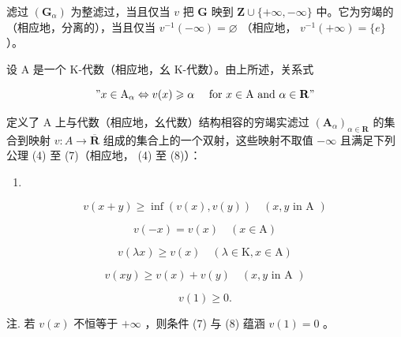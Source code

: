 滤过 \((\mathbf{G}_{\alpha})\) 为整滤过，当且仅当 \(v\) 把 \(\mathbf{G}\) 映到 \(\mathbf{Z} \cup \{+\infty, -\infty\}\) 中。它为穷竭的（相应地，分离的），当且仅当 \(v^{-1}(-\infty) = \varnothing\) （相应地， \(v^{-1}(+\infty) = \{e\}\) ）。

设 A 是一个 K-代数（相应地，幺 K-代数）。由上所述，关系式

\[
" x \in \mathrm{A} _ {\alpha} \Leftrightarrow v (x) \geqslant \alpha \quad \text { for } x \in \mathrm{A} \text { and } \alpha \in \mathbf {R}"
\]

定义了 A 上与代数（相应地，幺代数）结构相容的穷竭实滤过 \((\mathbf{A}_{\alpha})_{\alpha\in\mathbf{R}}\) 的集合到映射 \(v: A \to \overline{\mathbf{R}}\) 组成的集合上的一个双射，这些映射不取值 \(-\infty\) 且满足下列公理 (4) 至 (7)（相应地， (4) 至 (8)）：

\begin{enumerate}
\def\labelenumi{(\arabic{enumi})}
\setcounter{enumi}{3}
\tightlist
\item
\end{enumerate}

\[
v (x + y) \geqslant \inf (v (x), v (y)) \quad (x, y \text {   in   A })\tag{5}
\]

\[
v (- x) = v (x) \quad (x \in \mathrm{A})\tag{6}
\]

\[
v (\lambda x) \geqslant v (x) \quad (\lambda \in \mathrm{K}, x \in \mathrm{A})\tag{7}
\]

\[
v (x y) \geqslant v (x) + v (y) \quad (x, y \text {   in   A })\tag{8}
\]

\[
v (1) \geqslant 0.
\]

注. 若 \(v(x)\) 不恒等于 \(+\infty\) ，则条件 (7) 与 (8) 蕴涵 \(v(1) = 0\) 。

